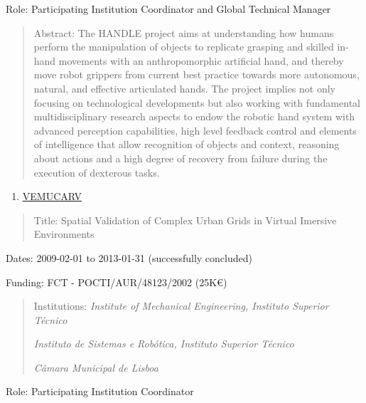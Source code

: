 Role: Participating Institution Coordinator and Global Technical Manager

\begin{quote}
Abstract: The HANDLE project aims at understanding how humans perform
the manipulation of objects to replicate grasping and skilled in-hand
movements with an anthropomorphic artificial hand, and thereby move
robot grippers from current best practice towards more autonomous,
natural, and effective articulated hands. The project implies not only
focusing on technological developments but also working with fundamental
multidisciplinary research aspects to endow the robotic hand system with
advanced perception capabilities, high level feedback control and
elements of intelligence that allow recognition of objects and context,
reasoning about actions and a high degree of recovery from failure
during the execution of dexterous tasks.
\end{quote}

\begin{enumerate}
\def\labelenumi{\arabic{enumi}.}
\setcounter{enumi}{7}
\item
  \ul{VEMUCARV}
\end{enumerate}

\begin{quote}
Title: Spatial Validation of Complex Urban Grids in Virtual Imersive
Environments
\end{quote}

Dates: 2009-02-01 to 2013-01-31 (successfully concluded)

Funding: FCT - POCTI/AUR/48123/2002 (25K€)

\begin{quote}
Institutions: \emph{Institute of Mechanical Engineering, Instituto
Superior Técnico}

\emph{Instituto de Sistemas e Robótica, Instituto Superior Técnico}

\emph{Câmara Municipal de Lisboa}
\end{quote}

Role: Participating Institution Coordinator

